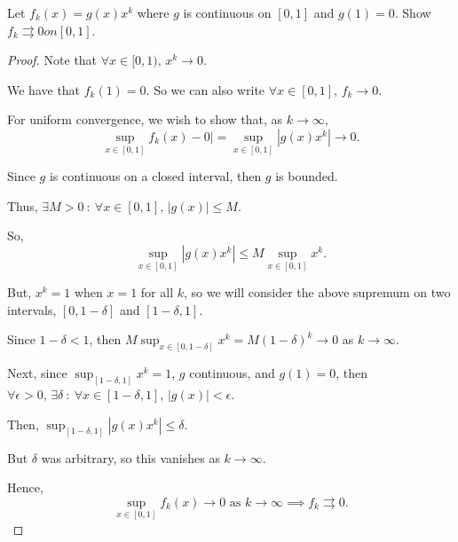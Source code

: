 \documentclass[../hw3]{subfiles}
\begin{document}
\begin{problem}
Let $f_k(x)=g(x)x^k$ where  $g$ is continuous on  $[0,1]$ and  $g(1)=0$.
Show $f_k \rightrightarrows 0 on [0,1]$.
\end{problem}
\begin{proof}
	Note that $\forall x \in  [0,1),\, x^{k}\to 0$.

	We have that $f_k(1)=0$. So we can also write  $\forall x \in [0,1],\, f_k\to 0$.

	For uniform convergence, we wish to show that, as $k\to \infty$, \[
		\sup_{x \in [0,1]}f_k(x)-0 |=\sup_{x \in  [0,1]}\left| g(x)x^k \right| \to 0
		.\]

	Since $g$ is continuous on a closed interval, then  $g$ is bounded.

	Thus,  $\exists M>0\ :\ \forall x \in [0,1],\, |g(x)|\le M$.

	So, \[
		\sup_{x \in [0,1]}\left| g(x)x^k \right| \le M \sup_{x \in  [0,1]} x^k
		.\]

	But, $x^k=1$ when  $x=1$ for all $k$, so we will consider the above supremum on two intervals,  $[0,1-\delta]$ and  $[1-\delta,1]$.

	Since  $1-\delta<1$, then  $M \sup_{x \in [0,1-\delta]}x^k = M{(1-\delta)}^k \to 0$ as $k\to \infty$.

	Next, since $\sup_{[1-\delta,1]}x^k =1$, $g$ continuous, and $g(1)=0$,
	then  $\forall \epsilon>0,\, \exists \delta\ :\ \forall x \in [1-\delta,1],\, |g(x)|<\epsilon $.

	Then, $\sup_{[1-\delta,1]} \left| g(x)x^k \right| \le \delta $.

	But $\delta$ was arbitrary, so this vanishes as  $k\to \infty$.

	Hence,  \[
		\sup_{x \in  [0,1]} f_k(x) \to  0 \text{ as } k\to \infty \implies f_k \rightrightarrows 0
		.\]
\end{proof}
\end{document}
